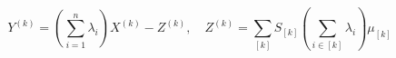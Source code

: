 \begin{equation}
Y^{(k)}= \left(\sum_{i=1}^n \lambda_i \right) X^{(k)} -Z^{(k)}, \quad  Z^{(k)} =\sum_{[k]} S_{[k]}  
\left( \sum_{i \in [k]} \lambda_i \right)\mu_{[k]} 
\label{defZr}
\end{equation}

